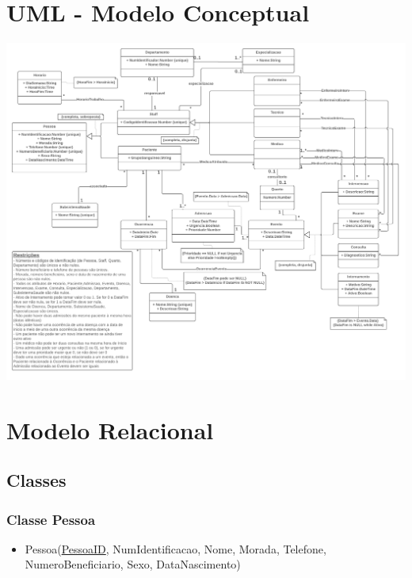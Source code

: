 \documentclass[article, a4paper, 12pt, oneside]{memoir}
\begin{document}
\chapter[UML - Modelo Conceptual][UML]{UML - Modelo Conceptual} \label{\thechapter}
\hspace*{-1.3cm}\includegraphics[width=1.1\linewidth, height=1.0\linewidth]{BDAD-UML.png}

\newpage
\chapter[Modelo Relacional][Modelo Relacional]{Modelo Relacional} \label{\thechapter}

\section{Classes}
\subsection{Classe Pessoa}
\begin{itemize}
	\item Pessoa(\underline{PessoaID}, NumIdentificacao, Nome, Morada, Telefone, NumeroBeneficiario, Sexo, DataNascimento)
\end{itemize}
\end{document}
